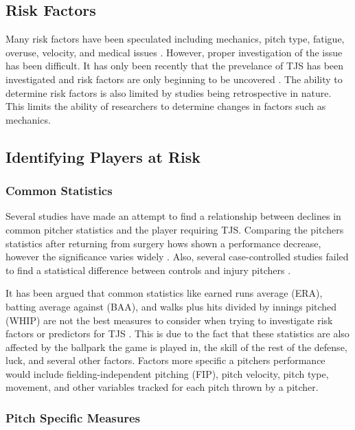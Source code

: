 \subsection{Risk Factors}

Many risk factors have been speculated including mechanics, pitch type, fatigue, overuse, velocity, and medical issues \cite{Keller2016} \cite{Fleisig2015}. However, proper investigation of the issue has been difficult. It has only been recently that the prevelance of TJS has been investigated and risk factors are only beginning to be uncovered \cite{Conte2015}. The ability to determine risk factors is also limited by studies being retrospective in nature. This limits the ability of researchers to determine changes in factors such as mechanics.

\subsection{Identifying Players at Risk}

\subsubsection{Common Statistics}

Several studies have made an attempt to find a relationship between declines in common pitcher statistics and the player requiring TJS. Comparing the pitchers statistics after returning from surgery hows shown a performance decrease, however the significance varies widely \cite{Makhni2014}. Also, several case-controlled studies failed to find a statistical difference between controls and injury pitchers \cite{Jiang2014} \cite{Erickson2014}.

It has been argued that common statistics like earned runs average (ERA), batting average against (BAA), and walks plus hits divided by innings pitched (WHIP) are not the best measures to consider when trying to investigate risk factors or predictors for TJS \cite{Gray2014}. This is due to the fact that these statistics are also affected by the ballpark the game is played in, the skill of the rest of the defense, luck, and several other factors. Factors more specific a pitchers performance would include fielding-independent pitching (FIP), pitch velocity, pitch type, movement, and other variables tracked for each pitch thrown by a pitcher.

\subsubsection{Pitch Specific Measures}

